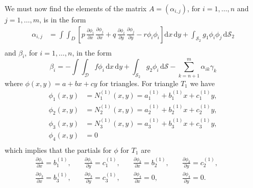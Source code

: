 \documentclass[12pt]{article}
\newcommand{\dd}[1]{\mathrm{d}{#1}}
\begin{document}
We must now find the elements of the matrix $A = (\alpha_{i,j})$, for
$i=1,\ldots,n$ and $j=1,\ldots,m$, is in the form
\begin{equation}
  \label{eq:1_alpha_phi}
  \begin{aligned}
    \alpha_{i,j} &=
    \int\int_{D}\left[
      p \,
      \frac{\partial\phi_i}{\partial x} \,
      \frac{\partial\phi_j}{\partial x} +
      q \,
      \frac{\partial\phi_i}{\partial y} \,
      \frac{\partial\phi_j}{\partial y} -
      r
      \phi_i
      \phi_i
    \right]
    \dd{x}\,\dd{y} +
    \int_{\mathcal{S}_2}
      g_1\phi_i\phi_j \,
    \dd{\mathcal{S}_2} \\
  \end{aligned}
\end{equation}
and $\beta_i$, for $i=1,\ldots,n$, in the form
\begin{equation}
  \label{eq:1_beta_phi}
  \beta_i = -\int\int_{\mathcal{D}}f\phi_i\,\dd{x}\,\dd{y} +
  \int_{\mathcal{S}_2}g_2\phi_i\,\dd{\mathcal{S}} -
  \sum_{k=n+1}^{m}\alpha_{ik}\gamma_{k}
\end{equation}
where $\phi(x,y) = a + bx + cy$ for triangles.
For triangle $T_1$ we have
\begin{equation}
  \label{eq:1_t1_phi}
  \begin{aligned}
    \phi_1(x,y) &= N_1^{(1)}(x,y) =
    a_1^{(1)} + b_1^{(1)}x + c_1^{(1)}y,\\ 
    \phi_2(x,y) &= N_2^{(1)}(x,y) =
    a_2^{(1)} + b_2^{(1)}x + c_2^{(1)}y, \\
    \phi_3(x,y) &= N_3^{(1)}(x,y) =
    a_3^{(1)} + b_3^{(1)}x + c_3^{(1)}y,\\ 
    \phi_4(x,y) &= 0 \\
  \end{aligned}
\end{equation}
which implies that the partials for $\phi$ for $T_1$ are
\begin{equation}
  \label{eq:1_t1_dphi}
  \begin{aligned}
    \frac{\partial\phi_1}{\partial x} = b_1^{(1)},&\quad
    \frac{\partial\phi_1}{\partial y} = c_1^{(1)},&\quad
    \frac{\partial\phi_2}{\partial x} = b_2^{(1)},&\quad
    \frac{\partial\phi_2}{\partial y} = c_2^{(1)},&\quad \\
    \frac{\partial\phi_3}{\partial x} = b_3^{(1)},&\quad
    \frac{\partial\phi_3}{\partial y} = c_3^{(1)},&\quad
    \frac{\partial\phi_4}{\partial x} = 0,& \quad   
    \frac{\partial\phi_4}{\partial y} = 0.& \quad
  \end{aligned}
\end{equation}
\end{document}
